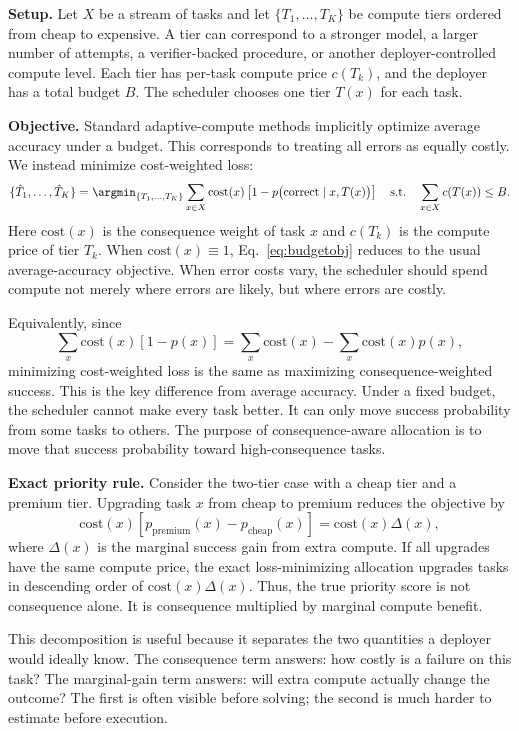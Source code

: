 \documentclass{article}
\begin{document}
\textbf{Setup.}
Let $X$ be a stream of tasks and let
$\{T_1,\ldots,T_K\}$ be compute tiers ordered from cheap to expensive.
A tier can correspond to a stronger model, a larger number of attempts,
a verifier-backed procedure, or another deployer-controlled compute
level. Each tier has per-task compute price $c(T_k)$, and the deployer
has a total budget $B$. The scheduler chooses one tier $T(x)$ for each
task.

\textbf{Objective.}
Standard adaptive-compute methods implicitly optimize average accuracy
under a budget. This corresponds to treating all errors as equally
costly. We instead minimize cost-weighted loss:
\begin{equation}
\label{eq:budgetobj}
\{\hat{T}_1,\dots,\hat{T}_K\}=\argmin_{\{T_1,\dots,T_K\}}
\sum_{x\in X}
\mathrm{cost}(x)
\left[
1-p\bigl(\mathrm{correct}\mid x,T(x)\bigr)
\right]
\quad
\mathrm{s.t.}
\quad
\sum_{x\in X} c(T(x)) \le B .
\end{equation}
Here $\mathrm{cost}(x)$ is the consequence weight of task $x$ and
$c(T_k)$ is the compute price of tier $T_k$. When
$\mathrm{cost}(x)\equiv 1$, Eq.~\ref{eq:budgetobj} reduces to the
usual average-accuracy objective. When error costs vary, the scheduler
should spend compute not merely where errors are likely, but where
errors are costly.

Equivalently, since
\[
\sum_x \mathrm{cost}(x)[1-p(x)]
=
\sum_x \mathrm{cost}(x)
-
\sum_x \mathrm{cost}(x)p(x),
\]
minimizing cost-weighted loss is the same as maximizing
consequence-weighted success. This is the key difference from average
accuracy. Under a fixed budget, the scheduler cannot make every task
better. It can only move success probability from some tasks to others.
The purpose of consequence-aware allocation is to move that success
probability toward high-consequence tasks.

\textbf{Exact priority rule.}
Consider the two-tier case with a cheap tier and a premium tier.
Upgrading task $x$ from cheap to premium reduces the objective by
\[
\mathrm{cost}(x)
\left[
p_{\mathrm{premium}}(x)-p_{\mathrm{cheap}}(x)
\right]
=
\mathrm{cost}(x)\Delta(x),
\]
where $\Delta(x)$ is the marginal success gain from extra compute. If
all upgrades have the same compute price, the exact loss-minimizing
allocation upgrades tasks in descending order of
$\mathrm{cost}(x)\Delta(x)$. Thus, the true priority score is not
consequence alone. It is consequence multiplied by marginal compute
benefit.

This decomposition is useful because it separates the two quantities a
deployer would ideally know. The consequence term answers: how costly
is a failure on this task? The marginal-gain term answers: will extra
compute actually change the outcome? The first is often visible before
solving; the second is much harder to estimate before execution.
\end{document}
